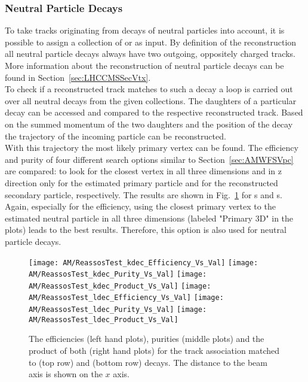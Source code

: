 \subsubsection{Neutral Particle Decays \label{sec:AMWFSVnd}}
To take tracks originating from decays of neutral particles into account, it is possible to assign a collection of \PKzS{} or \PgL{} as input. By definition of the reconstruction all neutral particle decays always have two outgoing, oppositely charged tracks. More information about the reconstruction of neutral particle decays can be found in Section~\ref{sec:LHCCMSSecVtx}. \\
To check if a reconstructed track matches to such a decay a loop is carried out over all neutral decays from the given collections. The daughters of a particular decay can be accessed and compared to the respective reconstructed track. Based on the summed momentum of the two daughters and the position of the decay the trajectory of the incoming particle can be reconstructed. \\
With this trajectory the most likely primary vertex can be found. The efficiency and purity of four different search options similar to Section~\ref{sec:AMWFSVpc} are compared: to look for the closest vertex in all three dimensions and in z direction only for the estimated primary particle and for the reconstructed secondary particle, respectively. The results are shown in Fig.~\ref{plot:AMWFSVdecEffAndPurSO} for  \PKzS{}s and \PgL{}s. Again, especially for the efficiency, using the closest primary vertex to the estimated neutral particle in all three dimensions (labeled "Primary 3D" in the plots) leads to the best results. Therefore, this option is also used for neutral particle decays.

\begin{figure}[!ht]
    \centering
    \texttt{[image: AM/ReassosTest\_kdec\_Efficiency\_Vs\_Val]}
    \texttt{[image: AM/ReassosTest\_kdec\_Purity\_Vs\_Val]}
    \texttt{[image: AM/ReassosTest\_kdec\_Product\_Vs\_Val]}
    \newline
    \texttt{[image: AM/ReassosTest\_ldec\_Efficiency\_Vs\_Val]}
    \texttt{[image: AM/ReassosTest\_ldec\_Purity\_Vs\_Val]}
    \texttt{[image: AM/ReassosTest\_ldec\_Product\_Vs\_Val]}
    \caption[Efficiency, purity and their product of the association with \PKzS{} and \PgL{} decays for different search options as a function of distance to the beam axis]{The efficiencies (left hand plots), purities (middle plots) and the product of both (right hand plots) for the track association matched to \PKzS{} (top row) and \PgL{} (bottom row) decays. The distance to the beam axis is shown on the $x$ axis.\label{plot:AMWFSVdecEffAndPurSO}}
\end{figure}

